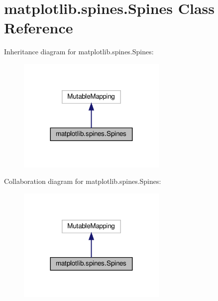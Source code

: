 \hypertarget{classmatplotlib_1_1spines_1_1Spines}{}\section{matplotlib.\+spines.\+Spines Class Reference}
\label{classmatplotlib_1_1spines_1_1Spines}


Inheritance diagram for matplotlib.\+spines.\+Spines\+:
\nopagebreak
\begin{figure}[H]
\begin{center}
\leavevmode
\includegraphics[width=203pt]{classmatplotlib_1_1spines_1_1Spines__inherit__graph}
\end{center}
\end{figure}


Collaboration diagram for matplotlib.\+spines.\+Spines\+:
\nopagebreak
\begin{figure}[H]
\begin{center}
\leavevmode
\includegraphics[width=203pt]{classmatplotlib_1_1spines_1_1Spines__coll__graph}
\end{center}
\end{figure}
